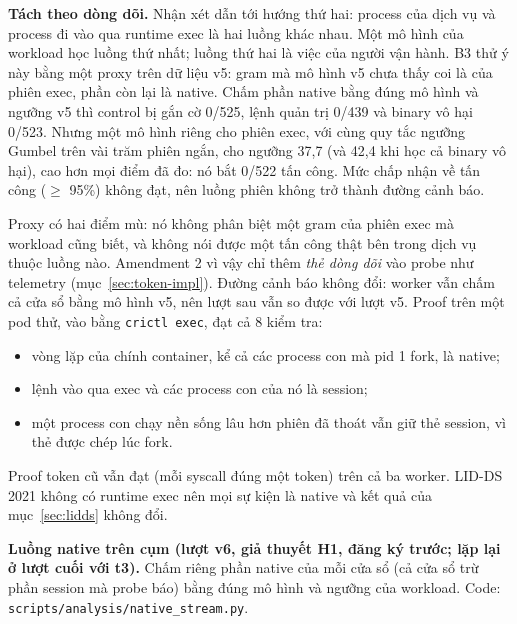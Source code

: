 \textbf{Tách theo dòng dõi.} Nhận xét dẫn tới hướng thứ hai: process của dịch vụ và process đi vào qua runtime exec là hai luồng khác nhau. Một mô hình của workload học luồng thứ nhất; luồng thứ hai là việc của người vận hành. B3 thử ý này bằng một proxy trên dữ liệu v5: gram mà mô hình v5 chưa thấy coi là của phiên exec, phần còn lại là native. Chấm phần native bằng đúng mô hình và ngưỡng v5 thì control bị gắn cờ 0/525, lệnh quản trị 0/439 và binary vô hại 0/523. Nhưng một mô hình riêng cho phiên exec, với cùng quy tắc ngưỡng Gumbel trên vài trăm phiên ngắn, cho ngưỡng 37,7 (và 42,4 khi học cả binary vô hại), cao hơn mọi điểm đã đo: nó bắt 0/522 tấn công. Mức chấp nhận về tấn công ($\ge$ 95\%) không đạt, nên luồng phiên không trở thành đường cảnh báo.

Proxy có hai điểm mù: nó không phân biệt một gram của phiên exec mà workload cũng biết, và không nói được một tấn công thật bên trong dịch vụ thuộc luồng nào. Amendment 2 vì vậy chỉ thêm \emph{thẻ dòng dõi} vào probe như telemetry (mục~\ref{sec:token-impl}). Đường cảnh báo không đổi: worker vẫn chấm cả cửa sổ bằng mô hình v5, nên lượt sau vẫn so được với lượt v5. Proof trên một pod thử, vào bằng \texttt{crictl exec}, đạt cả 8 kiểm tra:
\begin{itemize}
\tightlist
\item
  vòng lặp của chính container, kể cả các process con mà pid 1 fork, là native;
\item
  lệnh vào qua exec và các process con của nó là session;
\item
  một process con chạy nền sống lâu hơn phiên đã thoát vẫn giữ thẻ session, vì thẻ được chép lúc fork.
\end{itemize}
Proof token cũ vẫn đạt (mỗi syscall đúng một token) trên cả ba worker. LID-DS 2021 không có runtime exec nên mọi sự kiện là native và kết quả của mục~\ref{sec:lidds} không đổi.

\textbf{Luồng native trên cụm (lượt v6, giả thuyết H1, đăng ký trước; lặp lại ở lượt cuối với t3).} Chấm riêng phần native của mỗi cửa sổ (cả cửa sổ trừ phần session mà probe báo) bằng đúng mô hình và ngưỡng của workload. Code: \texttt{scripts/\allowbreak{}analysis/\allowbreak{}native\_\allowbreak{}stream.py}.

